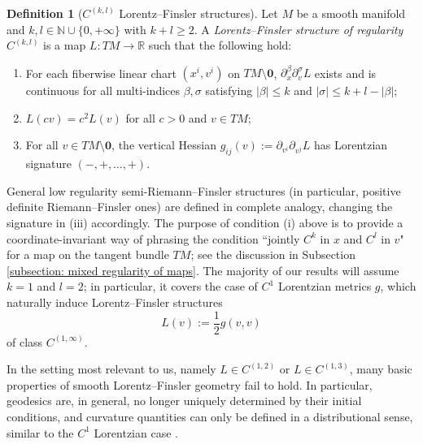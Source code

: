 \documentclass[a4paper,11pt]{article}
\numberwithin{equation}{section}
\theoremstyle{definition}
\newtheorem{Definition}{Definition}[section]
\theoremstyle{plain}
\newcommand{\R}{\mathbb R}
\newcommand{\N}{\mathbb N}
\begin{document}
\begin{Definition}[$C^{(k,l)}$ Lorentz--Finsler structures]
Let $M$ be a smooth manifold and $k,l \in \N \cup \{0,+\infty\}$ with $k + l \geq 2$. A \emph{Lorentz--Finsler structure of regularity $C^{(k,l)}$} is a map $L: TM \to \R$ such that the following hold:
\begin{enumerate}
    \item For each fiberwise linear chart $(x^i,v^i)$ on $TM \setminus \mathbf 0$, $\partial_x^\beta \partial_v^\sigma L$ exists and is continuous for all multi-indices $\beta,\sigma$ satisfying $|\beta| \leq k$ and $|\sigma| \leq k + l - |\beta|$;
    \item $L(cv) = c^2 L(v)$ for all $c > 0$ and $v \in TM$;
    \item For all $v \in TM \setminus \mathbf 0$, the vertical Hessian $g_{ij}(v):=\partial_{v^i} \partial_{v^j} L$ has Lorentzian signature $(-,+,\dots,+)$.
\end{enumerate}
\end{Definition}

General low regularity semi-Riemann--Finsler structures (in particular, positive definite Riemann--Finsler ones) are defined in complete analogy, changing the signature in (iii) accordingly. 
The purpose of condition (i) above is to provide a coordinate-invariant way of phrasing the condition ``jointly $C^k$ in $x$ and $C^l$ in $v$" for a map on the tangent bundle $TM$; see the discussion in Subsection \ref{subsection: mixed regularity of maps}. 
The majority of our results will assume $k = 1$ and $l = 2$; in particular, it covers the case of $C^1$ Lorentzian metrics $g$, which naturally induce Lorentz--Finsler structures
\begin{equation*}
    L(v):=\frac{1}{2} g(v,v)
\end{equation*}
of class $C^{(1,\infty)}$.

In the setting most relevant to us, namely $L \in C^{(1,2)}$ or $L \in C^{(1,3)}$, many basic properties of smooth Lorentz--Finsler geometry fail to hold.
In particular, geodesics are, in general, no longer uniquely determined by their initial conditions, and curvature quantities can only be defined in a distributional sense, similar to the $C^1$ Lorentzian case \cite{Graf-SingularityC1, KOSS, SchinnerlSteinbauer, quintetnonsmooth}.
\end{document}
